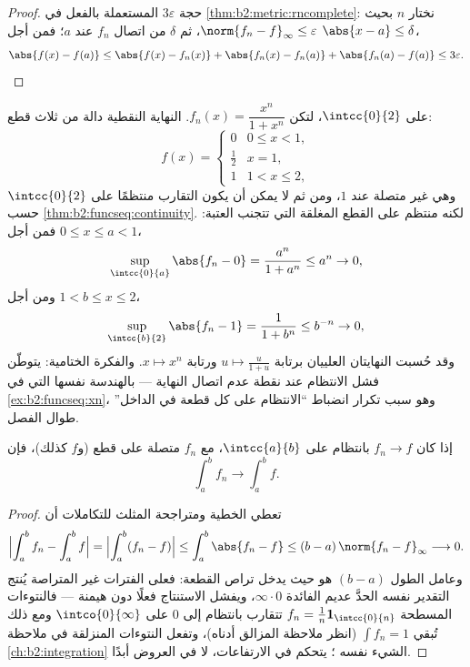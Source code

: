 \begin{proof}
حجة $3\varepsilon$ المستعملة بالفعل في
\cref{thm:b2:metric:rncomplete}: نختار $n$ بحيث $\norm{f_n -
f}_\infty \leq \varepsilon$، ثم $\delta$ من اتصال
$f_n$ عند $a$؛ فمن أجل $\abs{x - a} \leq \delta$،
\[
\abs{f(x) - f(a)} \leq \abs{f(x) - f_n(x)} + \abs{f_n(x) - f_n(a)}
+ \abs{f_n(a) - f(a)} \leq 3\varepsilon . \qedhere
\]
\end{proof}

\begin{example}\label{ex:b2:funcseq:threshold}
على $\intcc{0}{2}$، لتكن $f_n(x) = \dfrac{x^n}{1 + x^n}$. النهاية
النقطية دالة من ثلاث قطع:
\[
f(x) = \begin{cases} 0 & 0 \leq x < 1,\\[2pt]
\tfrac12 & x = 1,\\[2pt]
1 & 1 < x \leq 2, \end{cases}
\]
وهي غير متصلة عند $1$، ومن ثم لا يمكن أن يكون التقارب
منتظمًا على $\intcc{0}{2}$ حسب \cref{thm:b2:funcseq:continuity}. لكنه منتظم على القطع
المغلقة التي تتجنب العتبة: فمن أجل $0 \leq x \leq
a < 1$،
\[
\sup_{\intcc{0}{a}}\abs{f_n - 0}
= \frac{a^n}{1 + a^n} \leq a^n \to 0 ,
\]
ومن أجل $1 < b \leq x \leq 2$،
\[
\sup_{\intcc{b}{2}}\abs{f_n - 1}
= \frac{1}{1 + b^n} \leq b^{-n} \to 0 ,
\]
وقد حُسبت النهايتان العلييان برتابة $u \mapsto
\frac{u}{1+u}$ ورتابة $x \mapsto x^n$. والفكرة الختامية: يتوطّن
فشل الانتظام عند نقطة عدم اتصال
النهاية --- بالهندسة نفسها التي في \cref{ex:b2:funcseq:xn}، وهو
سبب تكرار انضباط ``الانتظام على كل قطعة في الداخل''
طوال الفصل.
\end{example}

\begin{theorem}\label{thm:b2:funcseq:integration}
إذا كان $f_n \to f$ بانتظام على $\intcc{a}{b}$، مع $f_n$ متصلة
على قطع (و$f$ كذلك)، فإن
\[
\int_a^b f_n \longrightarrow \int_a^b f .
\]
\end{theorem}

\begin{proof}
تعطي الخطية ومتراجحة المثلث للتكاملات أن
\[
\Bigl|\int_a^b f_n - \int_a^b f\Bigr|
= \Bigl|\int_a^b (f_n - f)\Bigr|
\leq \int_a^b\abs{f_n - f}
\leq (b - a)\,\norm{f_n - f}_\infty \longrightarrow 0 .
\]
وعامل الطول $(b - a)$ هو حيث يدخل تراص القطعة:
فعلى الفترات غير المتراصة يُنتج التقدير نفسه الحدَّ
عديم الفائدة $\infty\cdot0$، ويفشل الاستنتاج فعلًا
دون هيمنة --- فالنتوءات المسطحة $f_n =
\frac1n\mathbf 1_{\intcc{0}{n}}$ تتقارب بانتظام إلى $0$ على
$\intco{0}{\infty}$ ومع ذلك تُبقي $\int f_n = 1$ (انظر ملاحظة المزالق
أدناه)، وتفعل النتوءات المنزلقة في ملاحظة
\cref{ch:b2:integration} الشيء نفسه ؛  يتحكم في الارتفاعات، لا في العروض أبدًا.
\end{proof}


